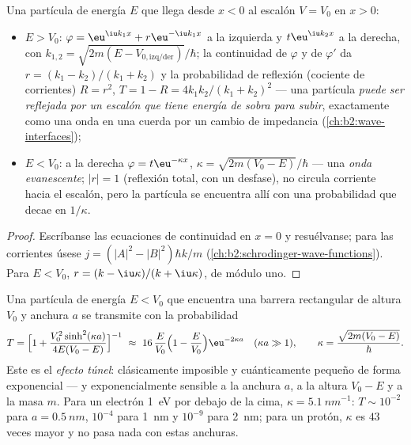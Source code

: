 \begin{proposition}\label{prop:b2:potential-wells-tunneling:step}
Una partícula de energía $E$ que llega desde $x < 0$ al escalón $V = V_0$
en $x > 0$:
\begin{itemize}
\item $E > V_0$: $\varphi = \eu^{\iu k_1x} + r\eu^{-\iu k_1x}$ a la izquierda y $t\eu^{\iu
      k_2x}$ a la derecha, con $k_{1,2} = \sqrt{2m(E - V_{0,\text{izq/der}})}/
      \hbar$; la continuidad de $\varphi$ y de $\varphi'$ da $r = (k_1 - k_2)/(k_1
      + k_2)$ y la probabilidad de reflexión (cociente de corrientes) $R = r^2$,
      $T = 1 - R = 4k_1k_2/(k_1 + k_2)^2$ --- una partícula \emph{puede ser
      reflejada por un escalón que tiene energía de sobra para subir}, exactamente como una onda en
      una cuerda por un cambio de impedancia (\cref{ch:b2:wave-interfaces});
\item $E < V_0$: a la derecha $\varphi = t\eu^{-\kappa x}$, $\kappa = \sqrt{2m(V_0
      - E)}/\hbar$ --- una \emph{onda evanescente}; $|r| = 1$ (reflexión total, con un desfase), no
      circula corriente hacia el escalón, pero la partícula se encuentra allí con una
      probabilidad que decae en $1/\kappa$.
\end{itemize}
\end{proposition}

\begin{proof}
Escríbanse las ecuaciones de continuidad en $x = 0$ y resuélvanse; para las corrientes
úsese $j = (|A|^2 - |B|^2)\hbar k/m$ (\cref{ch:b2:schrodinger-wave-functions}).
Para $E < V_0$, $r = (k - \iu\kappa)/(k + \iu\kappa)$, de módulo uno.
\end{proof}

\begin{theorem}\label{thm:b2:potential-wells-tunneling:tunnel}
Una partícula de energía $E < V_0$ que encuentra una barrera rectangular de altura
$V_0$ y anchura $a$ se transmite con la probabilidad
\[
T = \Big[1 + \frac{V_0^2\sinh^2(\kappa a)}{4E(V_0 - E)}\Big]^{-1}
\ \approx\ 16\,\frac{E}{V_0}\Big(1 - \frac{E}{V_0}\Big)\eu^{-2\kappa a}
\quad (\kappa a \gg 1), \qquad
\kappa = \frac{\sqrt{2m(V_0 - E)}}{\hbar} .
\]
Este es el \emph{efecto túnel}: clásicamente
imposible y cuánticamente pequeño de forma exponencial --- y
exponencialmente sensible a la anchura $a$, a la altura $V_0 - E$ y a la
masa $m$. Para un electrón \qty{1}{eV} por debajo de la cima, $\kappa = \qty{5.1}{nm^{-1}}$:
$T \sim 10^{-2}$ para $a = \qty{0.5}{nm}$, $10^{-4}$ para \qty{1}{nm} y $10^{-9}$ para
\qty{2}{nm}; para un protón, $\kappa$ es $43$ veces mayor y no pasa nada
con estas anchuras.
\end{theorem}

